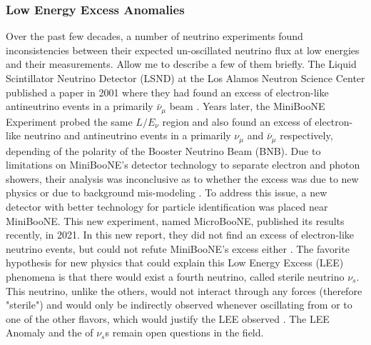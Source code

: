 \subsubsection{Low Energy Excess Anomalies}
%
Over the past few decades, a number of neutrino experiments found inconsistencies between their expected un-oscillated neutrino flux at low energies and their measurements. Allow me to describe a few of them briefly. The Liquid Scintillator Neutrino Detector (LSND) at the Los Alamos Neutron Science Center published a paper in 2001 where they had found an excess of electron-like antineutrino events in a primarily $\bar{\nu}_{\mu}$ beam \cite{lsnd}. Years later, the MiniBooNE Experiment probed the same $L/E_{\nu}$ region and also found an excess of electron-like neutrino and antineutrino events in a primarily $\nu_{\mu}$ and $\bar{\nu}_{\mu}$ respectively, depending of the polarity of the Booster Neutrino Beam (BNB). Due to limitations on MiniBooNE's detector technology to separate electron and photon showers, their analysis was inconclusive as to whether the excess was due to new physics or due to background mis-modeling \cite{miniboone}. To address this issue, a new detector with better technology for particle identification was placed near MiniBooNE. This new experiment, named MicroBooNE, published its results recently, in 2021. In this new report, they did not find an excess of electron-like neutrino events, but could not refute MiniBooNE's excess either \cite{microboone_lee}. The favorite hypothesis for new physics that could explain this Low Energy Excess (LEE) phenomena is that there would exist a fourth neutrino, called sterile neutrino $\nu_s$. This neutrino, unlike the others, would not interact through any forces (therefore "sterile") and would only be indirectly observed whenever oscillating from or to one of the other flavors, which would justify the LEE observed \cite{Lauren_thesis}. 
The LEE Anomaly and the of $\nu_s$s remain open questions in the field. 